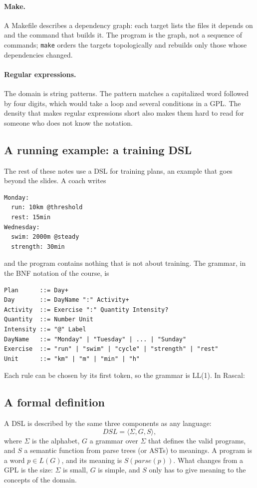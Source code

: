 \paragraph{Make.} A Makefile describes a dependency graph: each target lists
the files it depends on and the command that builds it. The program is the
graph, not a sequence of commands; \texttt{make} orders the targets
topologically and rebuilds only those whose dependencies changed.

\paragraph{Regular expressions.} The domain is string patterns. The pattern
matches a capitalized word followed by four digits, which would take a loop
and several conditions in a GPL. The density that makes regular expressions
short also makes them hard to read for someone who does not know the
notation.

\subsection{A running example: a training DSL}

The rest of these notes use a DSL for training plans, an example that goes
beyond the slides. A coach writes
\begin{lstlisting}
Monday:
  run: 10km @threshold
  rest: 15min
Wednesday:
  swim: 2000m @steady
  strength: 30min
\end{lstlisting}
and the program contains nothing that is not about training. The grammar, in
the BNF notation of the course, is
\begin{lstlisting}
Plan      ::= Day+
Day       ::= DayName ":" Activity+
Activity  ::= Exercise ":" Quantity Intensity?
Quantity  ::= Number Unit
Intensity ::= "@" Label
DayName   ::= "Monday" | "Tuesday" | ... | "Sunday"
Exercise  ::= "run" | "swim" | "cycle" | "strength" | "rest"
Unit      ::= "km" | "m" | "min" | "h"
\end{lstlisting}
Each rule can be chosen by its first token, so the grammar is LL(1). In Rascal:

\subsection{A formal definition}

A DSL is described by the same three components as any language:
\[
  \mathit{DSL} = \langle \Sigma, G, S \rangle,
\]
where $\Sigma$ is the alphabet, $G$ a grammar over $\Sigma$ that defines the
valid programs, and $S$ a semantic function from parse trees (or ASTs) to
meanings. A program is a word $p \in L(G)$, and its meaning is
$S(\mathit{parse}(p))$. What changes from a GPL is the size: $\Sigma$ is small,
$G$ is simple, and $S$ only has to give meaning to the concepts of the domain.

